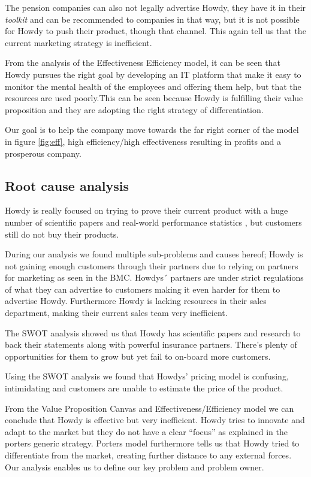 \noindent The pension companies can also not legally advertise Howdy, they have it in their \textit{toolkit} and can be recommended to companies in that way, but it is not possible for Howdy to push their product, though that channel. This again tell us that the current marketing strategy is inefficient. 

\noindent From the analysis of the Effectiveness Efficiency model, it can be seen that Howdy pursues the right goal by developing an IT platform that make it easy to monitor the mental health of the employees and offering them help, but that the resources
are used poorly.This can be seen because Howdy is fulfilling their value proposition and they are adopting the right strategy of differentiation.

\noindent Our goal is to help the company move towards the far right corner of the model in figure \ref{fig:eff}, high efficiency/high effectiveness resulting in profits and a prosperous company. 


\subsection{Root cause analysis}
Howdy is really focused on trying to prove their current product with a huge number of scientific papers \cite[p.17]{oneofthepresentations} and real-world performance statistics \cite[p.25-29]{oneofthepresentations}, but customers still do not buy their products. 

\noindent During our analysis we found multiple sub-problems and causes hereof; Howdy is not gaining enough customers through their partners due to relying on partners for marketing as seen in the BMC. Howdys´ partners are under strict regulations of what they can advertise to customers making it even harder for them to advertise Howdy. Furthermore Howdy is lacking resources in their sales department, making their current sales team very inefficient.

\noindent The SWOT analysis showed us that Howdy has scientific papers and research to back their statements along with powerful insurance partners. There’s plenty of opportunities for them to grow but yet fail to on-board more customers.

\noindent Using the SWOT analysis we found that Howdys' pricing model is confusing, intimidating and customers are unable to estimate the price of the product.

\noindent From the Value Proposition Canvas and Effectiveness/Efficiency model we can conclude that Howdy is effective  but very inefficient. Howdy tries to innovate and adapt to the market but they do not have a clear “focus” as explained in the porters generic strategy. Porters model furthermore tells us that Howdy tried to differentiate from the market, creating further distance to any external forces\cite[p.190]{jones_george_2013}. Our analysis enables us to define our key problem and problem owner.

